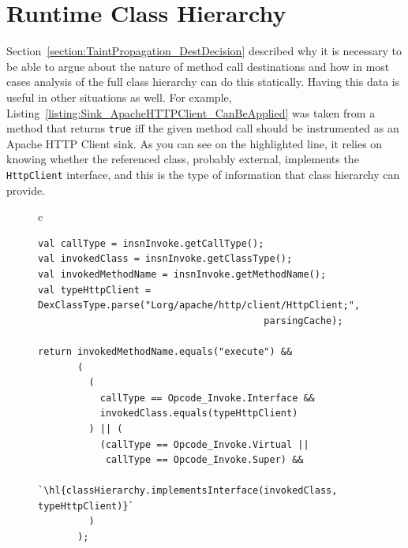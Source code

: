 \documentclass[12pt,twoside,notitlepage]{report}
\begin{document}

\section{Runtime Class Hierarchy}

Section~\ref{section:TaintPropagation_DestDecision} described why it is necessary to be able to argue about the nature of method call destinations and how in most cases analysis of the full class hierarchy can do this statically. Having this data is useful in other situations as well. For example, Listing~\ref{listing:Sink_ApacheHTTPClient_CanBeApplied} was taken from a method that returns \verb$true$ iff the given method call should be instrumented as an Apache HTTP Client sink. As you can see on the highlighted line, it relies on knowing whether the referenced class, probably external, implements the \verb$HttpClient$ interface, and this is the type of information that class hierarchy can provide.

\begin{figure}[h]
	\centering
	\begin{tabular}{c}
	\begin{lstlisting}
val callType = insnInvoke.getCallType();
val invokedClass = insnInvoke.getClassType();
val invokedMethodName = insnInvoke.getMethodName();
val typeHttpClient = DexClassType.parse("Lorg/apache/http/client/HttpClient;", 
                                        parsingCache);

return invokedMethodName.equals("execute") &&
       (
         (
           callType == Opcode_Invoke.Interface && 
           invokedClass.equals(typeHttpClient)
         ) || (
           (callType == Opcode_Invoke.Virtual || 
           	callType == Opcode_Invoke.Super) && 
           `\hl{classHierarchy.implementsInterface(invokedClass, typeHttpClient)}`
         )
       );
	\end{lstlisting}
	\end{tabular}
	\begin{lstlisting}[caption={Code that decides whether a method call given by instruction in \texttt{insnInvoke} should be instrumented as an Apache HTTP Client sink.},
	                   label={listing:Sink_ApacheHTTPClient_CanBeApplied}]
	\end{lstlisting}
\end{figure}
\end{document}
